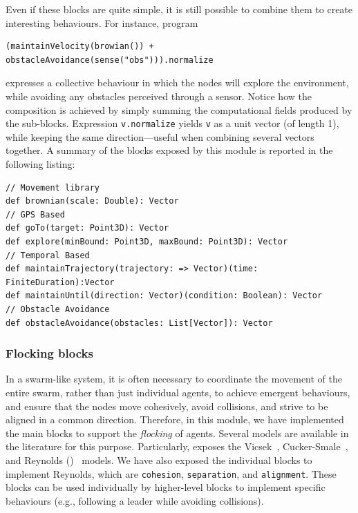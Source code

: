 Even if these blocks are quite simple, 
 it is still possible to combine them to create interesting behaviours. 
For instance, program 
\begin{lstlisting}
(maintainVelocity(browian()) + obstacleAvoidance(sense("obs"))).normalize
\end{lstlisting}
expresses a collective behaviour in which the nodes will explore the environment,
 while avoiding any obstacles perceived through a sensor. 
Notice how the composition is achieved by simply summing the computational fields produced by the sub-blocks.
%
Expression \lstinline|v.normalize| yields \lstinline|v| as a unit vector (of length 1), while keeping the same direction---useful when combining several vectors together.
%
A summary of the blocks exposed by this module is reported in the following listing:
\begin{lstlisting}
// Movement library
def brownian(scale: Double): Vector
// GPS Based
def goTo(target: Point3D): Vector
def explore(minBound: Point3D, maxBound: Point3D): Vector
// Temporal Based
def maintainTrajectory(trajectory: => Vector)(time: FiniteDuration):Vector
def maintainUntil(direction: Vector)(condition: Boolean): Vector
// Obstacle Avoidance
def obstacleAvoidance(obstacles: List[Vector]): Vector
\end{lstlisting}

\subsubsection{Flocking blocks}\label{subsec:flockig} 
In a swarm-like system, 
 it is often necessary to coordinate the movement of the entire swarm, 
 rather than just individual agents, to achieve emergent behaviours,
 and ensure that the nodes move cohesively, avoid collisions, 
 and strive to be aligned in a common direction. 
% 
Therefore, in this module, 
 we have implemented the main blocks to support the \emph{flocking} of agents. 
% 
Several models are available in the literature for this purpose.
 Particularly, \MacroSwarm{} exposes 
 the Vicsek~\cite{VicsekModeling1995}, 
 Cucker-Smale~\cite{CuckerSmaleModeling2007}, 
 and Reynolds ()~\cite{DBLP:conf/siggraph/Reynolds87} models. 
% 
% 
We have also exposed the individual blocks to implement Reynolds, 
 which are \lstinline|cohesion|, \lstinline|separation|, and \lstinline|alignment|. 
% 
These blocks can be used individually by higher-level blocks to implement specific behaviours 
 (e.g., following a leader while avoiding collisions). 


